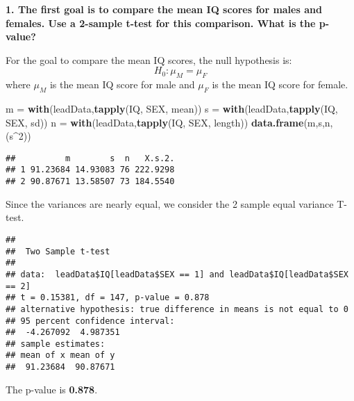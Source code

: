 \documentclass[
]{article}
\newenvironment{Shaded}{\begin{snugshade}}{\end{snugshade}}
\newcommand{\DataTypeTok}[1]{\textcolor[rgb]{0.13,0.29,0.53}{#1}}
\newcommand{\DecValTok}[1]{\textcolor[rgb]{0.00,0.00,0.81}{#1}}
\newcommand{\KeywordTok}[1]{\textcolor[rgb]{0.13,0.29,0.53}{\textbf{#1}}}
\newcommand{\NormalTok}[1]{#1}
\newcommand{\OperatorTok}[1]{\textcolor[rgb]{0.81,0.36,0.00}{\textbf{#1}}}
\newcommand{\StringTok}[1]{\textcolor[rgb]{0.31,0.60,0.02}{#1}}
\begin{document}
\textbf{1. The first goal is to compare the mean IQ scores for males and
females. Use a 2-sample t-test for this comparison. What is the
p-value?}

For the goal to compare the mean IQ scores, the null hypothesis is:
\[H_0: \mu_M = \mu_F\] where \(\mu_M\) is the mean IQ score for male and
\(\mu_F\) is the mean IQ score for female.

\begin{Shaded}
\begin{Highlighting}[]
\NormalTok{m =}\StringTok{ }\KeywordTok{with}\NormalTok{(leadData,}\KeywordTok{tapply}\NormalTok{(IQ, SEX, mean))}
\NormalTok{s =}\StringTok{ }\KeywordTok{with}\NormalTok{(leadData,}\KeywordTok{tapply}\NormalTok{(IQ, SEX, sd))}
\NormalTok{n =}\StringTok{ }\KeywordTok{with}\NormalTok{(leadData,}\KeywordTok{tapply}\NormalTok{(IQ, SEX, length))}
\KeywordTok{data.frame}\NormalTok{(m,s,n,(s}\OperatorTok{^}\DecValTok{2}\NormalTok{))}
\end{Highlighting}
\end{Shaded}

\begin{verbatim}
##          m        s  n   X.s.2.
## 1 91.23684 14.93083 76 222.9298
## 2 90.87671 13.58507 73 184.5540
\end{verbatim}

Since the variances are nearly equal, we consider the 2 sample equal
variance T-test.

\begin{Shaded}
\end{Shaded}

\begin{verbatim}
## 
##  Two Sample t-test
## 
## data:  leadData$IQ[leadData$SEX == 1] and leadData$IQ[leadData$SEX == 2]
## t = 0.15381, df = 147, p-value = 0.878
## alternative hypothesis: true difference in means is not equal to 0
## 95 percent confidence interval:
##  -4.267092  4.987351
## sample estimates:
## mean of x mean of y 
##  91.23684  90.87671
\end{verbatim}

The p-value is \textbf{0.878}.
\end{document}

